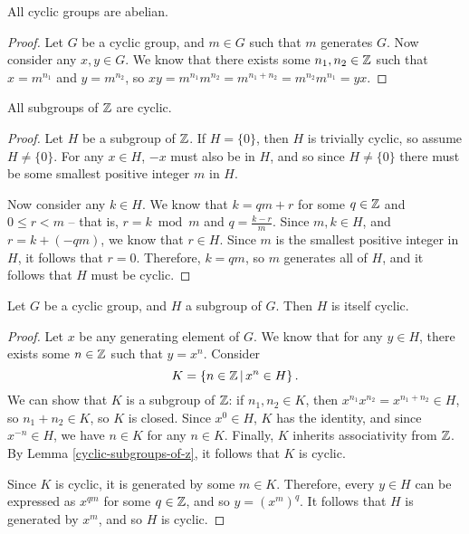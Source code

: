 \begin{prop}
    All cyclic groups are abelian.
\end{prop}

\begin{proof}
    Let $G$ be a cyclic group, and $m \in G$ such that $m$ generates $G$. Now consider any $x, y \in G$. We know that there exists some $n_1, n_2 \in \mathbb{Z}$ such that $x = m^{n_1}$ and $y = m^{n_2}$, so $xy = m^{n_1}m^{n_2} = m^{n_1 + n_2} = m^{n_2}m^{n_1} = yx$.
\end{proof}

\begin{lemma}\label{cyclic-subgroups-of-z}
    All subgroups of $\mathbb{Z}$ are cyclic.
\end{lemma}

\begin{proof}
    Let $H$ be a subgroup of $\mathbb{Z}$. If $H = \{0\}$, then $H$ is trivially cyclic, so assume $H \neq \{0\}$. For any $x \in H$, $-x$ must also be in $H$, and so since $H \neq \{0\}$ there must be some smallest positive integer $m$ in $H$.

    Now consider any $k \in H$. We know that $k = qm + r$ for some $q \in \mathbb{Z}$ and $0 \leq r < m$ -- that is, $r = k \bmod m$ and $q = \frac{k - r}{m}$. Since $m, k \in H$, and $r = k + (-qm)$, we know that $r \in H$. Since $m$ is the smallest positive integer in $H$, it follows that $r = 0$. Therefore, $k = qm$, so $m$ generates all of $H$, and it follows that $H$ must be cyclic.
\end{proof}

\begin{thm}
    Let $G$ be a cyclic group, and $H$ a subgroup of $G$. Then $H$ is itself cyclic.
\end{thm}

\begin{proof}
    Let $x$ be any generating element of $G$. We know that for any $y \in H$, there exists some $n \in \mathbb{Z}$ such that $y = x^n$. Consider \[K = \left\{n \in \mathbb{Z} \,\middle|\, x^n \in H\right\}.\] We can show that $K$ is a subgroup of $\mathbb{Z}$: if $n_1, n_2 \in K$, then $x^{n_1}x^{n_2} = x^{n_1 + n_2} \in H$, so $n_1 + n_2 \in K$, so $K$ is closed. Since $x^0 \in H$, $K$ has the identity, and since $x^{-n} \in H$, we have $n \in K$ for any $n \in K$. Finally, $K$ inherits associativity from $\mathbb{Z}$. By Lemma \ref{cyclic-subgroups-of-z}, it follows that $K$ is cyclic.

    Since $K$ is cyclic, it is generated by some $m \in K$. Therefore, every $y \in H$ can be expressed as $x^{qm}$ for some $q \in \mathbb{Z}$, and so $y = (x^m)^q$. It follows that $H$ is generated by $x^m$, and so $H$ is cyclic.
\end{proof}

